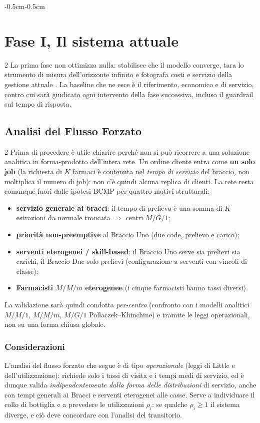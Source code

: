\documentclass{article}
\begin{document}
\begin{adjustwidth}{-0.5cm}{-0.5cm}
\section*{Fase I,  Il sistema attuale}
\begin{multicols}{2}
La prima fase non ottimizza nulla: stabilisce che il modello converge, tara lo
strumento di misura dell'orizzonte infinito e fotografa costi e servizio della
gestione attuale . La baseline che ne esce è il riferimento,  economico e di
servizio,  contro cui sarà giudicato ogni intervento della fase successiva, incluso il guardrail
sul tempo di risposta.
\end{multicols}
\subsection*{Analisi del Flusso Forzato}
\begin{multicols}{2}
Prima di procedere è utile chiarire perché non si può ricorrere a una soluzione analitica in
forma-prodotto dell'intera rete. Un ordine cliente entra come \textbf{un solo job}
(la richiesta di $K$ farmaci è contenuta nel \emph{tempo di servizio} del braccio, non moltiplica
il numero di job): non c'è quindi alcuna replica di clienti. La rete resta comunque fuori dalle
ipotesi BCMP per quattro motivi strutturali:
\begin{itemize}
    \item[\ding{112}] \textbf{servizio generale ai bracci}: il tempo di prelievo è una
    somma di $K$ estrazioni da normale troncata $\Rightarrow$ centri $M/G/1$;
    \item[\ding{112}] \textbf{priorità non-preemptive} al Braccio Uno (due code, prelievo e carico);
    \item[\ding{112}] \textbf{serventi eterogenei / skill-based}: il Braccio Uno serve sia prelievi
    sia carichi, il Braccio Due solo prelievi (configurazione a serventi con vincoli di classe);
    \item[\ding{112}] \textbf{Farmacisti $M/M/m$ eterogenee} (i cinque farmacisti hanno tassi diversi).
\end{itemize}
La validazione sarà quindi condotta \emph{per-centro} (confronto con i modelli analitici $M/M/1$,
$M/M/m$, $M/G/1$ Pollaczek--Khinchine) e tramite le leggi operazionali, non su una forma chiusa
globale.

\subsubsection*{Considerazioni}
L'analisi del flusso forzato che segue è di tipo \emph{operazionale} (leggi di Little e
dell'utilizzazione): richiede solo i tassi di visita e i tempi medi di servizio, ed è dunque valida
\emph{indipendentemente dalla forma delle distribuzioni} di servizio,  anche con tempi generali
ai Bracci e serventi eterogenei alle casse. Serve a individuare il collo di bottiglia e a
prevedere le utilizzazioni $\rho_i$: se qualche $\rho_i \ge 1$ il sistema diverge, e ciò deve
concordare con l'analisi del transitorio.


\end{multicols}
\end{adjustwidth}
\end{document}
